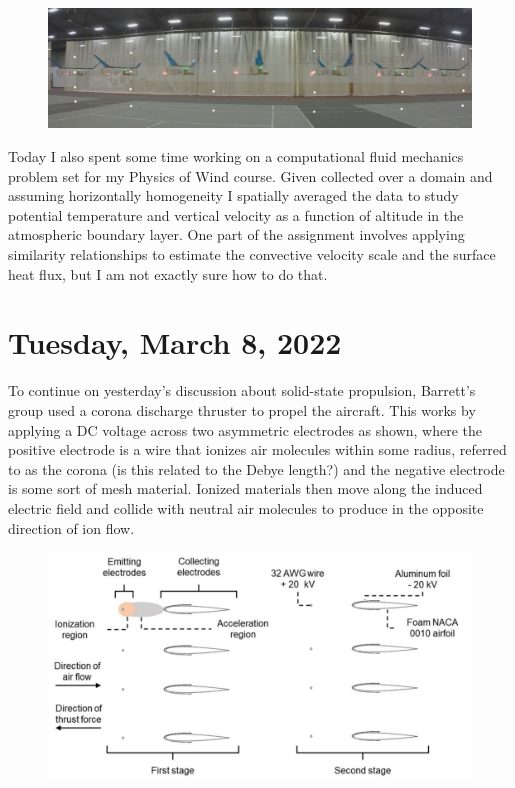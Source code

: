\documentclass[12pt]{report}
\begin{document}
\begin{figure}[H]
\centering
\includegraphics[width=\linewidth]{images/ionocraftmotion.pdf}
\end{figure}

\par
Today I also spent some time working on a computational fluid mechanics problem set for my Physics of Wind course. Given collected over a domain and assuming horizontally homogeneity I spatially averaged the data to study potential temperature and vertical velocity as a function of altitude in the atmospheric boundary layer. One part of the assignment involves applying similarity relationships to estimate the convective velocity scale and the surface heat flux, but I am not exactly sure how to do that. 

\section{Tuesday, March 8, 2022}
\par
To continue on yesterday’s discussion about solid-state propulsion, Barrett’s group used a corona discharge thruster to propel the aircraft. This works by applying a DC voltage across two asymmetric electrodes as shown, where the positive electrode is a wire that ionizes air molecules within some radius, referred to as the corona (is this related to the Debye length?) and the negative electrode is some sort of mesh material. Ionized materials then move along the induced electric field and collide with neutral air molecules to produce in the opposite direction of ion flow. 

\begin{figure}[H]
\centering
\includegraphics[width=\linewidth]{images/thrustdiagram.pdf}
\end{figure}
\end{document}

